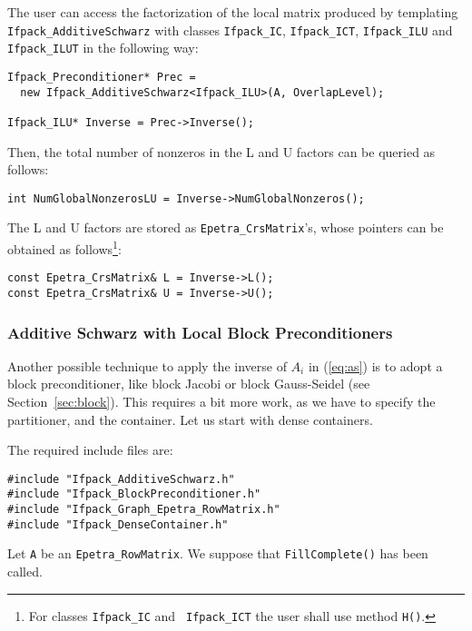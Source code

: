 The user can access the factorization of the local matrix produced by
templating \verb!Ifpack_AdditiveSchwarz! with classes \verb!Ifpack_IC!,
  \verb!Ifpack_ICT!, \verb!Ifpack_ILU! and \verb!Ifpack_ILUT! in the following
  way:
\begin{verbatim}
Ifpack_Preconditioner* Prec = 
  new Ifpack_AdditiveSchwarz<Ifpack_ILU>(A, OverlapLevel);

Ifpack_ILU* Inverse = Prec->Inverse();
\end{verbatim}
Then, the total number of nonzeros in the L and U factors can be queried as
follows:
\begin{verbatim}
int NumGlobalNonzerosLU = Inverse->NumGlobalNonzeros();
\end{verbatim}
The L and U factors are stored as \verb!Epetra_CrsMatrix!'s, whose pointers
can be obtained as follows\footnote{For classes {\tt Ifpack\_IC} and {\tt
  Ifpack\_ICT} the user shall use method {\tt H()}.}:
\begin{verbatim}
const Epetra_CrsMatrix& L = Inverse->L();
const Epetra_CrsMatrix& U = Inverse->U();
\end{verbatim}

\subsubsection{Additive Schwarz with Local Block Preconditioners}
\label{sec:as_b_ov}

Another possible technique to apply the inverse of $A_i$ in (\ref{eq:as})
is to adopt a block preconditioner, like block Jacobi 
or block Gauss-Seidel (see
Section~\ref{sec:block}). This requires a
bit more work, as we have to specify the partitioner, and the container. Let
us start with dense containers.

The required include files are:
\begin{verbatim}
#include "Ifpack_AdditiveSchwarz.h"
#include "Ifpack_BlockPreconditioner.h"
#include "Ifpack_Graph_Epetra_RowMatrix.h"
#include "Ifpack_DenseContainer.h"
\end{verbatim}

Let \verb!A! be an \verb!Epetra_RowMatrix!. We suppose that
\verb!FillComplete()! has been called. 

